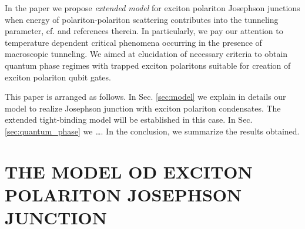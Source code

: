 \documentclass[aps, pre, preprint, groupedaddress, superscriptaddress, showkeys, showpacs] {revtex4-1}
\begin{document}
In the paper we propose \textit{extended model} for exciton polariton Josephson junctions when energy of polariton-polariton scattering contributes into the tunneling parameter, cf. \cite{36,37,38} and references therein.
In particularly, we pay our attention to temperature dependent critical phenomena occurring in the presence of macroscopic tunneling.
We aimed at elucidation of necessary criteria to obtain quantum phase regimes with trapped exciton polaritons suitable for creation of exciton polariton qubit gates.

This paper is arranged as follows.
In Sec. \ref{sec:model} we explain in details our model to realize Josephson junction with exciton polariton condensates.
The extended tight-binding model will be established in this case. In Sec. \ref{sec:quantum_phase} we \dots.
In the conclusion, we summarize the results obtained.

\section{THE MODEL OD EXCITON POLARITON JOSEPHSON JUNCTION \label{sec:model}}
\end{document}

